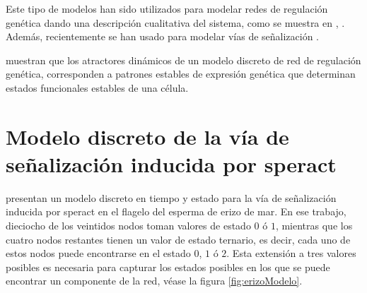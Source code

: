 Este tipo de modelos han sido utilizados para modelar redes de regulación genética dando una descripción cualitativa del sistema, como se muestra en \citeauthor{EspinosaSoto:2004jr} \citep{EspinosaSoto:2004jr}, \citeauthor{Albert:2003vx} \citep{Albert:2003vx}. Además, recientemente se han usado para modelar vías de señalización \citeauthor{Morris:2010gb} \citep{Morris:2010gb}.


\citeauthor{huang2005} \citep{huang2005} muestran que los atractores din\'amicos de un modelo discreto de red de regulación genética, corresponden a patrones estables de expresi\'on gen\'etica que determinan estados funcionales estables de una c\'elula. 






\section{Modelo discreto de la vía de señalización inducida por speract}\label{sect:erizo}


\citeauthor{Espinal2011} \citep{Espinal2011} presentan un modelo discreto en tiempo y estado para la vía de señalización inducida por speract en el flagelo del esperma de erizo de mar. En ese trabajo, dieciocho de los veintidos nodos toman valores de estado $0$ ó $1$, mientras que los cuatro nodos restantes tienen un valor de estado ternario, es decir, cada uno de estos nodos puede encontrarse en el estado $0$, $1$ ó $2$. Esta extensión a tres valores posibles es necesaria para capturar los estados posibles en los que se puede encontrar un componente de la red, véase la figura \ref{fig:erizoModelo}.

